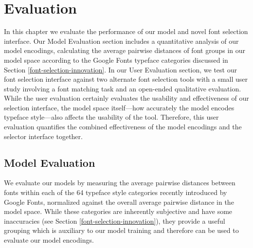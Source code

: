 \chapter{Evaluation}
\label{chap:evaluation}

In this chapter we evaluate the performance of our model and novel font selection interface. Our Model Evaluation section includes a quantitative analysis of our model encodings, calculating the average pairwise distances of font groups in our model space according to the Google Fonts typeface categories discussed in Section \ref{font-selection-innovation}. In our User Evaluation section, we test our font selection interface against two alternate font selection tools with a small user study involving a font matching task and an open-ended qualitative evaluation. While the user evaluation certainly evaluates the usability and effectiveness of our selection interface, the model space itself---how accurately the model encodes typeface style---also affects the usability of the tool. Therefore, this user evaluation quantifies the combined effectiveness of the model encodings and the selector interface together.

\section{Model Evaluation} \label{model-eval}

We evaluate our models by measuring the average pairwise distances between fonts within each of the 64 typeface style categories recently introduced by Google Fonts, normalized against the overall average pairwise distance in the model space. While these categories are inherently subjective and have some inaccuracies (see Section \ref{font-selection-innovation}), they provide a useful grouping which is auxiliary to our model training and therefore can be used to evaluate our model encodings.

